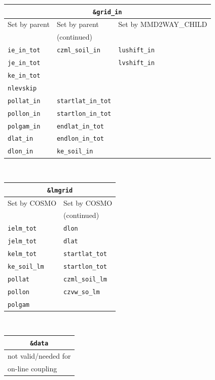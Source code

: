 \documentclass[11pt,twoside]{article}
\newcommand{\blockcode}{\ttfamily\color{OliveGreen}\par}
\begin{document}
\begin{center}
{\blockcode
\begin{tabular}{|lll|}\hline
\multicolumn{3}{c}{\tt \&grid\_in} \\ \hline
 Set by parent  & Set by parent  & Set by MMD2WAY\_CHILD  \\
                & (continued)    &                 \\ \hline

\tt  ie\_in\_tot      &\tt   czml\_soil\_in  & \tt lushift\_in \\
\tt  je\_in\_tot      &\tt       & \tt lvshift\_in \\
\tt  ke\_in\_tot      &\tt    &  \tt \\
\tt  nlevskip         &\tt       & \tt \\
\tt  pollat\_in       &\tt  startlat\_in\_tot& \tt \\
\tt  pollon\_in       &\tt  startlon\_in\_tot& \tt \\
\tt  polgam\_in       &\tt  endlat\_in\_tot  & \tt \\
\tt  dlat\_in         &\tt  endlon\_in\_tot  & \tt \\
\tt  dlon\_in         &\tt  ke\_soil\_in     & \tt \\ \hline

\end{tabular}\\[1.cm]
}
\bigskip
{\blockcode
\begin{tabular}{|ll|}\hline
\multicolumn{2}{c}{\tt \&lmgrid} \\ \hline
 Set by COSMO  &  Set by COSMO \\
               & (continued)   \\ \hline

\tt ielm\_tot & \tt dlon \\
\tt jelm\_tot & \tt dlat\\
\tt kelm\_tot & \tt startlat\_tot\\
\tt ke\_soil\_lm &\tt startlon\_tot\\
\tt pollat & \tt czml\_soil\_lm\\
\tt pollon & \tt czvw\_so\_lm \\
\tt polgam &\\ \hline
\end{tabular}\\[1.cm]
}
\bigskip
{\blockcode
\begin{tabular}{|l|}\hline
\multicolumn{1}{c}{\tt \&data} \\ \hline
 not valid/needed for \\ 
on-line  coupling  \\ \hline


\end{tabular}}
\end{center}
\end{document}

